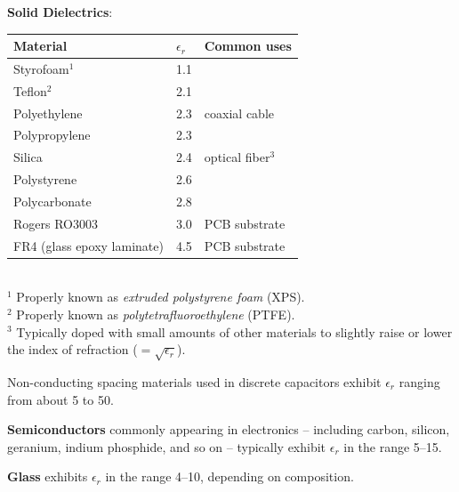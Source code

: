 \vfill\break
{\bf Solid Dielectrics}:
%
\begin{tabular}{lll}
Material                   & $\epsilon_r$ & Common uses \\
\hline
Styrofoam$^1$              & 1.1 & \\ \index{styrofoam} %
Teflon$^2$                 & 2.1 & \\ \index{teflon} %
Polyethylene               & 2.3 & coaxial cable \index{polyethylene} \\ %
Polypropylene              & 2.3 & \\ \index{polypropylene} %
Silica                     & 2.4 & optical fiber$^3$ \index{silica} \\ %
Polystyrene                & 2.6 & \\ \index{polystyrene} %
Polycarbonate              & 2.8 & \\ \index{polycarbonate} %
Rogers RO3003              & 3.0 & PCB substrate \\ \index{printed circuit board (PCB)!material}
FR4 (glass epoxy laminate) & 4.5 & PCB substrate \index{FR4} \\ %
\end{tabular}
%
~\\
$^1$ Properly known as \emph{extruded polystyrene foam} (XPS).\\
$^2$ Properly known as \emph{polytetrafluoroethylene} (PTFE).\\ 
$^3$ Typically doped with small amounts of other materials to slightly raise or lower the index of refraction 
($=\sqrt{\epsilon_r}$).

Non-conducting spacing materials used in discrete capacitors exhibit $\epsilon_r$ ranging from about 5 to 50.

{\bf Semiconductors} 
commonly appearing in electronics -- including carbon, silicon, 
geranium, 
indium phosphide, 
and so on -- typically exhibit $\epsilon_r$ in the range 5--15.  

{\bf Glass} 
exhibits $\epsilon_r$ in the range 4--10, depending on composition.

